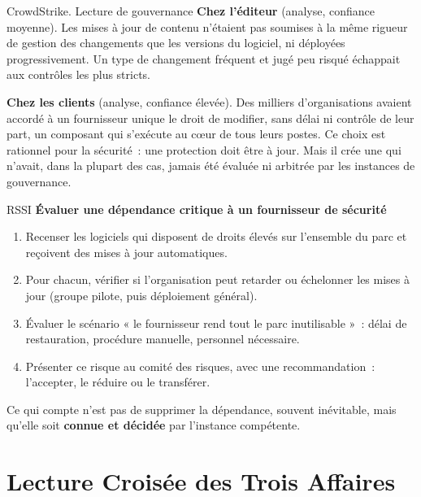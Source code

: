 \begin{boxscenario}{CrowdStrike. Lecture de gouvernance}
\textbf{Chez l'éditeur} (analyse, confiance moyenne). Les mises à jour de
contenu n'étaient pas soumises à la même rigueur de gestion des
changements que les versions du logiciel, ni déployées progressivement.
Un type de changement fréquent et jugé peu risqué échappait aux contrôles
les plus stricts.

\medskip
\textbf{Chez les clients} (analyse, confiance élevée). Des milliers
d'organisations avaient accordé à un fournisseur unique le droit de
modifier, sans délai ni contrôle de leur part, un composant qui s'exécute
au cœur de tous leurs postes. Ce choix est rationnel pour la sécurité~:
une protection doit être à jour. Mais il crée une  qui n'avait, dans la plupart des cas,
jamais été évaluée ni arbitrée par les instances de gouvernance.
\end{boxscenario}

\begin{boxmetier}{RSSI}
\textbf{Évaluer une dépendance critique à un fournisseur de sécurité}
\begin{enumerate}
    \item Recenser les logiciels qui disposent de droits élevés sur
          l'ensemble du parc et reçoivent des mises à jour automatiques.
    \item Pour chacun, vérifier si l'organisation peut retarder ou
          échelonner les mises à jour (groupe pilote, puis déploiement
          général).
    \item Évaluer le scénario « le fournisseur rend tout le parc
          inutilisable »~: délai de restauration, procédure manuelle,
          personnel nécessaire.
    \item Présenter ce risque au comité des risques, avec une
          recommandation~: l'accepter, le réduire ou le transférer.
\end{enumerate}
Ce qui compte n'est pas de supprimer la dépendance, souvent inévitable,
mais qu'elle soit \textbf{connue et décidée} par l'instance compétente.
\end{boxmetier}

\section{Lecture Croisée des Trois Affaires}
\label{sec:c02-croisee}

